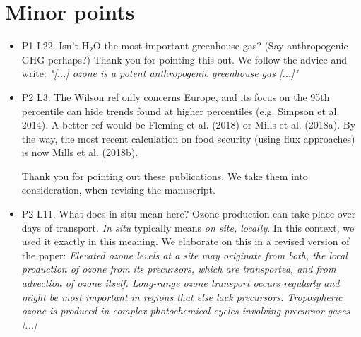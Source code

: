 \section{Minor points}
\begin{itemize}
\item {\color{blue}P1 L22. Isn’t $\mathrm{H_2O}$ the most important greenhouse gas? (Say anthropogenic
  GHG perhaps?)}
  Thank you for pointing this out. We follow the advice and write: \emph{"[...] ozone is a potent anthropogenic greenhouse gas [...]"}
\item {\color{blue}P2 L3. The Wilson ref only concerns Europe, and its focus on the 95th percentile can hide trends
  found at higher percentiles (e.g. Simpson et al. 2014). A better ref would be Fleming et al. (2018) or Mills et al. (2018a). By the way, the most recent calculation on food security (using flux approaches) is now Mills et al. (2018b).}
  
  Thank you for pointing out these publications. We take them into consideration, when revising the manuscript.
\item {\color{blue}P2 L11. What does in situ mean here? Ozone production can take place over
  days of transport.}
  \emph{In situ} typically means \emph{on site, locally}. In this context, we used it exactly in this meaning. We elaborate on this in a revised version of the paper: \emph{Elevated ozone levels at a site may originate from both, the local production of ozone from its precursors, which are transported, and from advection of ozone itself. Long-range ozone transport occurs regularly and might be most important in regions that else lack precursors. Tropospheric ozone is produced in complex photochemical cycles involving precursor gases [...]}
  

\end{itemize}
